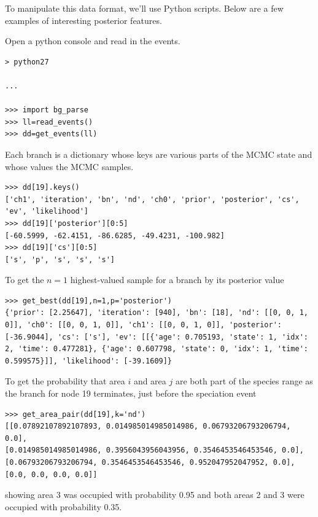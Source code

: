 \documentclass[11pt]{article}
\begin{document}
To manipulate this data format, we'll use Python scripts. Below are a few examples of interesting posterior features.

Open a python console and read in the events.

\begin{snugshade}
\begin{lstlisting}
> python27

...

>>> import bg_parse
>>> ll=read_events()
>>> dd=get_events(ll)
\end{lstlisting}
\end{snugshade}


Each branch is a dictionary whose keys are various parts of the MCMC state and whose values the MCMC samples.
\begin{snugshade}
\begin{lstlisting}
>>> dd[19].keys()
['ch1', 'iteration', 'bn', 'nd', 'ch0', 'prior', 'posterior', 'cs', 'ev', 'likelihood']
>>> dd[19]['posterior'][0:5]
[-60.5999, -62.4151, -86.6285, -49.4231, -100.982]
>>> dd[19]['cs'][0:5]
['s', 'p', 's', 's', 's']
\end{lstlisting}
\end{snugshade}

To get the $n=1$ highest-valued sample for a branch by its posterior value
\begin{snugshade}
\begin{lstlisting}
>>> get_best(dd[19],n=1,p='posterior')
{'prior': [2.25647], 'iteration': [940], 'bn': [18], 'nd': [[0, 0, 1, 0]], 'ch0': [[0, 0, 1, 0]], 'ch1': [[0, 0, 1, 0]], 'posterior': [-36.9044], 'cs': ['s'], 'ev': [[{'age': 0.705193, 'state': 1, 'idx': 2, 'time': 0.477281}, {'age': 0.607798, 'state': 0, 'idx': 1, 'time': 0.599575}]], 'likelihood': [-39.1609]}
\end{lstlisting}
\end{snugshade}

To get the probability that area $i$ and area $j$ are both part of the species range as the branch for node 19 terminates, just before the speciation event
\begin{snugshade}
\begin{lstlisting}
>>> get_area_pair(dd[19],k='nd')
[[0.07892107892107893, 0.014985014985014986, 0.06793206793206794, 0.0],
[0.014985014985014986, 0.3956043956043956, 0.3546453546453546, 0.0],
[0.06793206793206794, 0.3546453546453546, 0.952047952047952, 0.0],
[0.0, 0.0, 0.0, 0.0]]
\end{lstlisting}
\end{snugshade}
showing area 3 was occupied with probability 0.95 and both areas 2 and 3 were occupied with probability 0.35.
\end{document}
